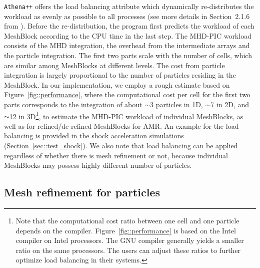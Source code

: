 \documentclass[fleqn,usenatbib]{mnras}
\begin{document}
\texttt{Athena++} offers the load balancing attribute which dynamically re-distributes the workload as evenly as possible to all processes (see more details in Section~2.1.6 from \citealp{2020ApJS..249....4S}). Before the re-distribution, the program first predicts the workload of each MeshBlock according to the CPU time in the last step. The MHD-PIC workload consists of the MHD integration, the overhead from the intermediate arrays and the particle integration. The first two parts scale with the number of cells, which are similar among MeshBlocks at different levels. The cost from particle integration is largely proportional to the number of particles residing in the MeshBlock. In our implementation, we employ a rough estimate based on Figure~\ref{fig::performance}, where the computational cost per cell for the first two parts corresponds to the integration of about $\sim$3 particles in 1D, $\sim$7 in 2D, and $\sim$12 in 3D\footnote{Note that the computational cost ratio between one cell and one particle depends on the compiler. Figure~\ref{fig::performance} is based on the Intel compiler on Intel processors. The GNU compiler generally yields a smaller ratio on the same processors. The users can adjust these ratios to further optimize load balancing in their systems.}, to estimate the MHD-PIC workload of individual MeshBlocks, as well as for refined/de-refined MeshBlocks for AMR. An example for the load balancing is provided in the shock acceleration simulations (Section~\ref{sec::test_shock}). We also note that load balancing can be applied regardless of whether there is mesh refinement or not, because individual MeshBlocks may possess highly different number of particles.

\subsection{Mesh refinement for particles}
\label{sec::refinement}
\end{document}
